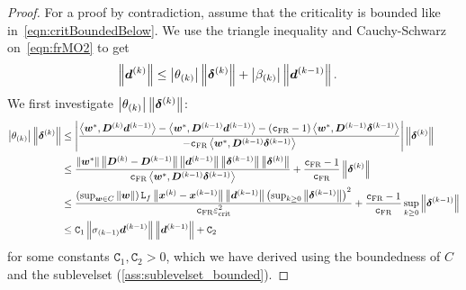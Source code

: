\documentclass{article}
\theoremstyle{plain}
\theoremstyle{definition}
\begin{document}
\begin{proof}
	For a proof by contradiction, assume that the criticality is bounded like in~\eqref{eqn:critBoundedBelow}.
	We use the triangle inequality and Cauchy-Schwarz on~\eqref{eqn:frMO2}
	to get
	\begin{align*}
		\left\|\bm{d}^{(k)}\right\|
			&\leq
			\left|\theta_{(k)}\right|
			\left\|\bm{\delta}^{(k)}\right\|
			+
			\left|\beta_{(k)}\right|
			\left\|\bm{d}^{(k-1)}\right\|
			.
	\end{align*}
	We first investigate $\left|\theta_{(k)}\right|\left\|\bm{\delta}^{(k)}\right\|$:
	\begin{align}
	\left|\theta_{(k)}\right|\left\|\bm{\delta}^{(k)}\right\|	
	&\leq 
		\left|
			\frac{
				\left\langle \bm{w}^*, \bm{D}^{(k)} \bm{d}^{(k-1)} \right\rangle
				-
				\left\langle \bm{w}^*, \bm{D}^{(k-1)} \bm{d}^{(k-1)} \right\rangle
				-
				(\mathtt{c}_{\text{FR}}-1)
				\left\langle \bm{w}^*, \bm{D}^{(k-1)} \bm{\delta}^{(k-1)} \right\rangle
			}{
				-\mathtt{c}_{\text{FR}}
				\left\langle \bm{w}^*, \bm{D}^{(k-1)} \bm{\delta}^{(k-1)} \right\rangle
			}
		\right|
		\left\|\bm{\delta}^{(k)}\right\|
	\nonumber
	\\
	&\leq
		\frac{
			\left\|\bm{w}^*\right\|
			\left\|\bm{D}^{(k)} - \bm{D}^{(k-1)}\right\|
			\left\|\bm{d}^{(k-1)}\right\|
			\left\|\bm{\delta}^{(k-1)}\right\|
			\left\|\bm{\delta}^{(k)}\right\|
			}{
				\mathtt{c}_{\text{FR}}
				\left\langle \bm{w}^*, \bm{D}^{(k-1)} \bm{\delta}^{(k-1)} \right\rangle
			}
		+
		\frac{\mathtt{c}_{\text{FR}} - 1}{\mathtt{c}_{\text{FR}}}\left\|\bm{\delta}^{(k)}\right\|
	\nonumber
	\\
	&\leq
	\frac{
		\left(\sup_{\bm{w}\in C} \left\|\bm{w}\right\|\right)
		\mathtt{L}_{f} \left\|\bm{x}^{(k)} - \bm{x}^{(k-1)}\right\|\left\|\bm{d}^{(k-1)}\right\|
		\left(\sup_{k \geq 0} \left\|\bm{\delta}^{(k-1)}\right\|\right)^2
		}{
			\mathtt{c}_{\text{FR}} \varepsilon_{\mathrm{crit}}^2
	}
	+
		\frac{\mathtt{c}_{\text{FR}} - 1}{\mathtt{c}_{\text{FR}}}\sup_{k \geq 0} \left\|\bm{\delta}^{(k-1)}\right\|
	\nonumber
	\\
	&\leq
	\mathtt C_1
	\left\|\sigma_{(k-1)} \bm{d}^{(k-1)}\right\|
	\left\|\bm{d}^{(k-1)}\right\|
	+
	\mathtt C_2
	\label{eqn:huhusScabbards}
	\end{align}
	for some constants $\mathtt C_1, \mathtt C_2 > 0$, which we have derived using 
	the boundedness of $C$ and the sublevelset (\cref{ass:sublevelset_bounded}).
	

\end{proof}
\end{document}

